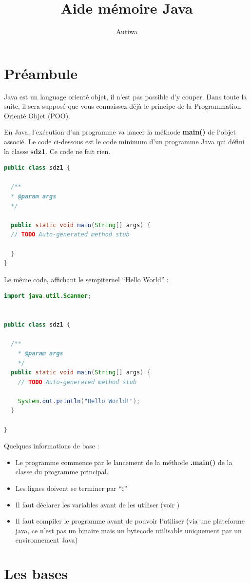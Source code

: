 \documentclass[a4paper,twoside]{article}
\title{Aide mémoire Java}
\author{Autiwa}
\begin{document}
\tableofcontents

\clearpage

\section{Préambule}
Java est un language orienté objet, il n'est pas possible d'y couper. Dans toute la suite, il sera supposé que vous connaissez déjà le principe de la Programmation Orienté Objet (POO). 

En Java, l'exécution d'un programme va lancer la méthode \textbf{main()} de l'objet associé. Le code ci-dessous est le code minimum d'un programme Java qui défini la classe \textbf{sdz1}. Ce code ne fait rien. 
\begin{lstlisting}[language=java]
public class sdz1 {

  /**
  * @param args
  */

  public static void main(String[] args) {
  // TODO Auto-generated method stub

  }
}
\end{lstlisting}

Le même code, affichant le sempiternel ``Hello World'' : 
\begin{lstlisting}[language=java]
import java.util.Scanner;


public class sdz1 {

  /**
    * @param args
    */
  public static void main(String[] args) {
    // TODO Auto-generated method stub
    
    System.out.println("Hello World!");
  }

}
\end{lstlisting}

Quelques informations de base : 
\begin{itemize}
\item Le programme commence par le lancement de la méthode \textbf{.main()} de la classe du programme principal.%
\item Les lignes doivent se terminer par ``\textbf{;}''
\item Il faut déclarer les variables avant de les utiliser (voir )
\item Il faut compiler le programme avant de pouvoir l'utiliser (via une plateforme java, ce n'est pas un binaire mais un bytecode utilisable uniquement par un environnement Java)
\end{itemize}


\section{Les bases}
\end{document}
